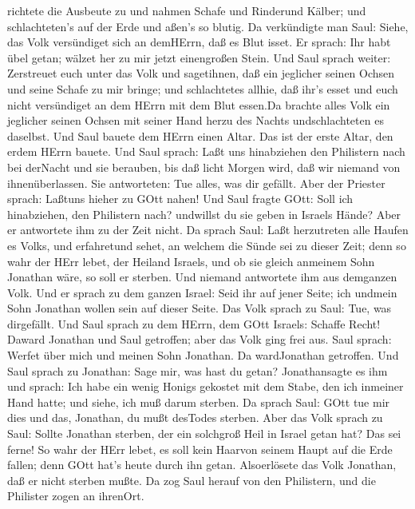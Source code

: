 richtete die Ausbeute zu und nahmen Schafe und Rinderund Kälber; und
schlachteten's auf der Erde und aßen's so blutig.  Da
verkündigte man Saul: Siehe, das Volk versündiget sich an demHErrn, daß
es Blut isset. Er sprach: Ihr habt übel getan; wälzet her zu mir jetzt
einengroßen Stein.  Und Saul sprach weiter: Zerstreuet euch
unter das Volk und sagetihnen, daß ein jeglicher seinen Ochsen und seine
Schafe zu mir bringe; und schlachtetes allhie, daß ihr's esset und euch
nicht versündiget an dem HErrn mit dem Blut essen.Da brachte alles Volk
ein jeglicher seinen Ochsen mit seiner Hand herzu des Nachts
undschlachteten es daselbst.  Und Saul bauete dem HErrn
einen Altar. Das ist der erste Altar, den erdem HErrn bauete.
 Und Saul sprach: Laßt uns hinabziehen den Philistern nach
bei derNacht und sie berauben, bis daß licht Morgen wird, daß wir
niemand von ihnenüberlassen. Sie antworteten: Tue alles, was dir
gefällt. Aber der Priester sprach: Laßtuns hieher zu GOtt nahen!
 Und Saul fragte GOtt: Soll ich hinabziehen, den Philistern
nach? undwillst du sie geben in Israels Hände? Aber er antwortete ihm zu
der Zeit nicht.  Da sprach Saul: Laßt herzutreten alle
Haufen es Volks, und erfahretund sehet, an welchem die Sünde sei zu
dieser Zeit;  denn so wahr der HErr lebet, der Heiland
Israels, und ob sie gleich anmeinem Sohn Jonathan wäre, so soll er
sterben. Und niemand antwortete ihm aus demganzen Volk. 
Und er sprach zu dem ganzen Israel: Seid ihr auf jener Seite; ich
undmein Sohn Jonathan wollen sein auf dieser Seite. Das Volk sprach zu
Saul: Tue, was dirgefällt.  Und Saul sprach zu dem HErrn,
dem GOtt Israels: Schaffe Recht! Daward Jonathan und Saul getroffen;
aber das Volk ging frei aus.  Saul sprach: Werfet über mich
und meinen Sohn Jonathan. Da wardJonathan getroffen.  Und
Saul sprach zu Jonathan: Sage mir, was hast du getan? Jonathansagte es
ihm und sprach: Ich habe ein wenig Honigs gekostet mit dem Stabe, den
ich inmeiner Hand hatte; und siehe, ich muß darum sterben. 
Da sprach Saul: GOtt tue mir dies und das, Jonathan, du mußt desTodes
sterben.  Aber das Volk sprach zu Saul: Sollte Jonathan
sterben, der ein solchgroß Heil in Israel getan hat? Das sei ferne! So
wahr der HErr lebet, es soll kein Haarvon seinem Haupt auf die Erde
fallen; denn GOtt hat's heute durch ihn getan. Alsoerlösete das Volk
Jonathan, daß er nicht sterben mußte.  Da zog Saul herauf
von den Philistern, und die Philister zogen an ihrenOrt. 
